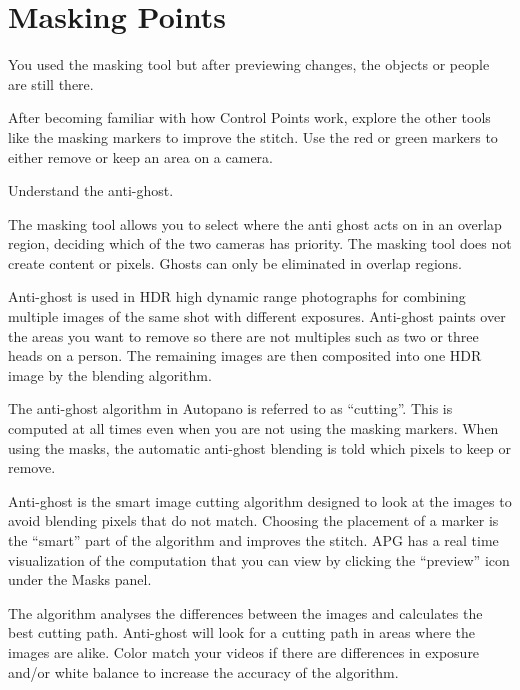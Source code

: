 \chapter{Masking Points}
\pagecolor{white}
\label{chap:41}
\begin{fullwidth}


\problem

{\large You used the masking tool but after previewing changes, the objects or people are still there. \par}

After becoming familiar with how Control Points work, explore the other tools like the masking markers to improve the stitch. Use the red or green markers to either remove or keep an area on a camera. 


\solutions

{\large Understand the anti-ghost. \par}

The masking tool allows you to select where the anti ghost acts on in an overlap region, deciding which of the two cameras has priority. The masking tool does not create content or pixels. Ghosts can only be eliminated in overlap regions.

Anti-ghost is used in HDR high dynamic range photographs for combining multiple images of the same shot with different exposures. Anti-ghost paints over the areas you want to remove so there are not multiples such as two or three heads on a person. The remaining images are then composited into one HDR image by the blending algorithm.

The anti-ghost algorithm in Autopano is referred to as “cutting”. This is computed at all times even when you are not using the masking markers. When using the masks, the automatic anti-ghost blending is told which pixels to keep or remove. 

Anti-ghost is the smart image cutting algorithm designed to look at the images to avoid blending pixels that do not match. Choosing the placement of a marker is the “smart” part of the algorithm and improves the stitch. APG has a real time visualization of the computation that you can view by clicking the “preview” icon under the Masks panel.

The algorithm analyses the differences between the images and calculates the best cutting path. Anti-ghost will look for a cutting path in areas where the images are alike. Color match your videos if there are differences in exposure and/or white balance to increase the accuracy of the algorithm.


\end{fullwidth}
